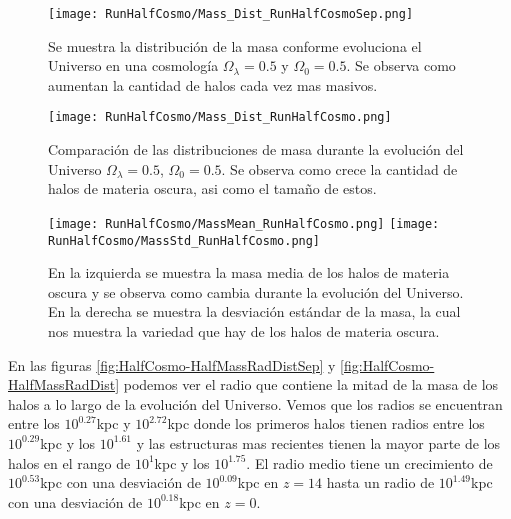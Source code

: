 \begin{figure}[H]
    \centering
    \texttt{[image: RunHalfCosmo/Mass\_Dist\_RunHalfCosmoSep.png]}
    \caption[Distribución de masa en la evolución de un Universo $\Omega_\lambda = 0.5$, $\Omega_0 = 0.5$]{\footnotesize Se muestra la distribución de la masa conforme evoluciona el Universo en una cosmología $\Omega_\lambda = 0.5$ y $\Omega_0 = 0.5$. Se observa como aumentan la cantidad de halos cada vez mas masivos.}
    \label{fig:HalfCosmo-MassDistSep}
\end{figure}

\begin{figure}[H]
    \centering
    \texttt{[image: RunHalfCosmo/Mass\_Dist\_RunHalfCosmo.png]}
    \caption[Comparación de distribución de masa Universo $\Omega_\lambda = 0.5$, $\Omega_0 = 0.5$]{\footnotesize Comparación de las distribuciones de masa durante la evolución del Universo $\Omega_\lambda = 0.5$, $\Omega_0 = 0.5$. Se observa como crece la cantidad de halos de materia oscura, asi como el tamaño de estos.}
    \label{fig:HalfCosmo-MassDist}
\end{figure}

\begin{figure}[H]
    \centering
    \texttt{[image: RunHalfCosmo/MassMean\_RunHalfCosmo.png]}
    \texttt{[image: RunHalfCosmo/MassStd\_RunHalfCosmo.png]}
    \caption[Media y desviación estándar de la distribución de masa de un Universo $\Omega_\lambda = 0.5$, $\Omega_0 = 0.5$]{\footnotesize En la izquierda se muestra la masa media de los halos de materia oscura y se observa como cambia durante la evolución del Universo. En la derecha se muestra la desviación estándar de la masa, la cual nos muestra la variedad que hay de los halos de materia oscura.}
    \label{fig:HalfCosmo-MassStats}
\end{figure}

En las figuras \ref{fig:HalfCosmo-HalfMassRadDistSep} y \ref{fig:HalfCosmo-HalfMassRadDist} podemos ver el radio que contiene la mitad de la masa de los halos a lo largo de la evolución del Universo. Vemos que los radios se encuentran entre los $10^{0.27}$kpc y $10^{2.72}$kpc donde los primeros halos tienen radios entre los $10^{0.29}$kpc y los $10^{1.61}$ y las estructuras mas recientes tienen la mayor parte de los halos en el rango de $10^{1}$kpc y los $10^{1.75}$. El radio medio tiene un crecimiento de $10^{0.53}$kpc con una desviación de $10^{0.09}$kpc en $z=14$ hasta un radio de $10^{1.49}$kpc con una desviación de $10^{0.18}$kpc en $z=0$.

